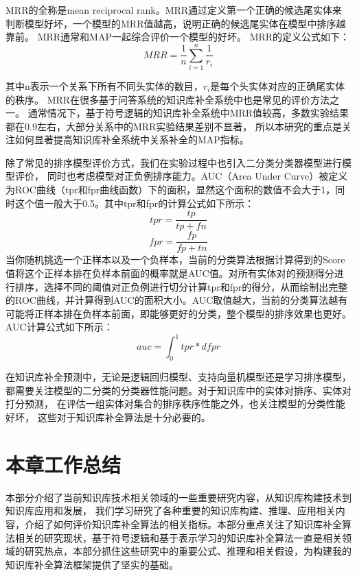 MRR的全称是mean reciprocal rank。MRR通过定义第一个正确的候选尾实体来判断模型好坏，一个模型的MRR值越高，说明正确的候选尾实体在模型中排序越靠前。
MRR通常和MAP一起综合评价一个模型的好坏。
MRR的定义公式如下：
$$MRR=\frac{1}{n} \sum_{i=1}^n \frac{1}{r_i}$$

其中n表示一个关系下所有不同头实体的数目，$r_i$是每个头实体对应的正确尾实体的秩序。
MRR在很多基于问答系统的知识库补全系统\cite{West2014}中也是常见的评价方法之一。
通常情况下，基于符号逻辑的知识库补全系统中MRR值较高，多数实验结果都在0.9左右，大部分关系中的MRR实验结果差别不显著，
所以本研究的重点是关注如何显著提高知识库补全系统中关系补全的MAP指标。


除了常见的排序模型评价方式，我们在实验过程中也引入二分类分类器模型进行模型评价，
同时也考虑模型对正负例排序能力。AUC（Area Under Curve）被定义为ROC曲线（tpr和fpr曲线函数）下的面积，显然这个面积的数值不会大于1，同时这个值一般大于0.5。其中tpr和fpr的计算公式如下所示：
$$tpr=\frac{tp}{tp+fn}$$
$$fpr=\frac{fp}{fp+tn}$$
当你随机挑选一个正样本以及一个负样本，当前的分类算法根据计算得到的Score值将这个正样本排在负样本前面的概率就是AUC值。对所有实体对的预测得分进行排序，选择不同的阈值对正负例进行切分计算tpr和fpr的得分，从而绘制出完整的ROC曲线，并计算得到AUC的面积大小。AUC取值越大，当前的分类算法越有可能将正样本排在负样本前面，即能够更好的分类，整个模型的排序效果也更好。AUC计算公式如下所示：
$$auc=\int_{0}^{1}{tpr}*d{fpr}$$

在知识库补全预测中，无论是逻辑回归模型、支持向量机模型还是学习排序模型，
都需要关注模型的二分类的分类器性能问题。对于知识库中的实体对排序、实体对打分预测，
在评估一组实体对集合的排序秩序性能之外，也关注模型的分类性能好坏，
这些对于知识库补全算法是十分必要的。

\section{本章工作总结}

本部分介绍了当前知识库技术相关领域的一些重要研究内容，从知识库构建技术到知识库应用和发展，
我们学习研究了各种重要的知识库构建、推理、应用相关内容，介绍了如何评价知识库补全算法的相关指标。本部分重点关注了知识库补全算法相关的研究现状，基于符号逻辑和基于表示学习的知识库补全算法一直是相关领域的研究热点，本部分抓住这些研究中的重要公式、推理和相关假设，为构建我的知识库补全算法框架提供了坚实的基础。








